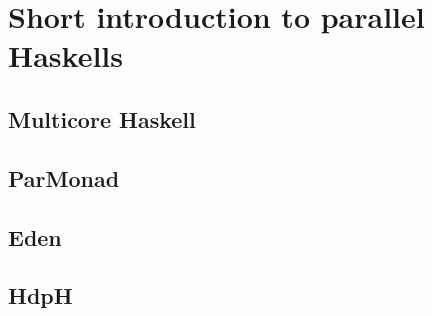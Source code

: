 \section{Short introduction to parallel Haskells}

\subsection{Multicore Haskell}

\subsection{ParMonad}

\subsection{Eden}

\subsection{HdpH}